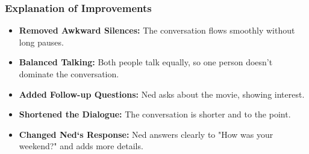\documentclass[12pt]{article}
\begin{document}
\subsubsection*{Explanation of Improvements}

\begin{itemize}
    \item \textbf{Removed Awkward Silences:} The conversation flows smoothly without long pauses.
    \item \textbf{Balanced Talking:} Both people talk equally, so one person doesn't dominate the conversation.
    \item \textbf{Added Follow-up Questions:} Ned asks about the movie, showing interest.
    \item \textbf{Shortened the Dialogue:} The conversation is shorter and to the point.
    \item \textbf{Changed Ned`s Response:} Ned answers clearly to "How was your weekend?" and adds more details.
\end{itemize}
\end{document}
